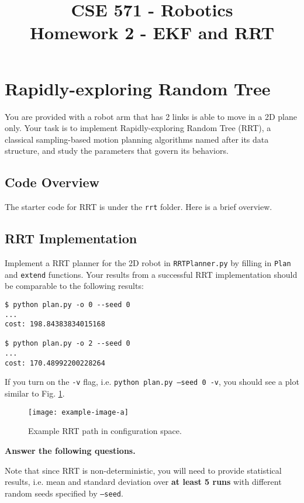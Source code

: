 \documentclass[tp]{lcc}
\title{CSE 571 - Robotics \\ Homework 2 - EKF and RRT}
\author{}
\date{}
\begin{document}
\maketitle

\section{Rapidly-exploring Random Tree}
You are provided with a robot arm that has 2 links is able to move in a 2D plane only. Your task is to implement Rapidly-exploring Random Tree (RRT), a classical sampling-based motion planning algorithms named after its data structure, and study the parameters that govern its behaviors.

\subsection{Code Overview}
The starter code for RRT is under the \texttt{rrt} folder. Here is a brief overview.

\subsection{RRT Implementation}
Implement a RRT planner for the 2D robot in \texttt{RRTPlanner.py} by filling in \texttt{Plan} and \texttt{extend} functions. Your results from a successful RRT implementation should be comparable to the following results:

\begin{verbatim}
$ python plan.py -o 0 --seed 0
...
cost: 198.84383834015168

$ python plan.py -o 2 --seed 0
...
cost: 170.48992200228264
\end{verbatim}

If you turn on the \texttt{-v} flag, i.e. \texttt{python plan.py --seed 0 -v}, you should see a plot similar to Fig. \ref{fig:rrt}.

 \begin{figure}[h]
     \centering
     \texttt{[image: example-image-a]}
     \caption{Example RRT path in configuration space.}
     \label{fig:rrt}
 \end{figure}

\textbf{Answer the following questions.}

Note that since RRT is non-deterministic, you will need to provide statistical results, i.e. mean and standard deviation over \textbf{at least 5 runs} with different random seeds specified by \texttt{--seed}.
\end{document}
